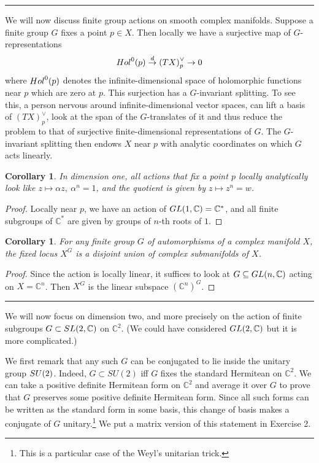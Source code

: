 \documentclass[11pt]{article}
\numberwithin{equation}{section}
\numberwithin{footnote}{section}
\newtheorem{cor}[thm]{Corollary}
\newcommand{\blue}{\color{blue}}
\newcommand{\C}{{\mathbb C}}
\begin{document}
\smallskip
{\blue \hrule}
We will now discuss finite group actions on smooth complex manifolds. 
Suppose a finite group $G$ fixes a point $p\in X$. Then locally we have a surjective map of $G$-representations 
$$
{\rm Hol}^0(p) \stackrel {d}{\to} \left(TX \right)^\vee_p\to 0
$$
where ${\rm Hol}^0(p)$ denotes the infinite-dimensional space of holomorphic functions near $p$ which are zero at $p$.
This surjection has a $G$-invariant splitting. To see this, a person nervous around infinite-dimensional vector spaces, can lift a basis of $\left(TX \right)^\vee_p$, look at the span of the $G$-translates of it and thus reduce the problem to that of surjective finite-dimensional representations of $G$. The $G$-invariant splitting then endows $X$ near $p$ with analytic coordinates on which $G$ acts {\blue linearly}. 


\smallskip
\begin{cor}\label{dim1fixed}
In dimension one, all actions that fix a point $p$ locally analytically look like $z\mapsto \alpha z,~\alpha^n=1$, and the quotient is given by 
$z\mapsto z^n=w$.
\end{cor}

\begin{proof}
Locally near $p$, we have an action of ${\rm GL}(1,\C) =\C^*$, and all finite subgroups of $ \C^*$ are given by groups of $n$-th roots of $1$.
\end{proof}

\begin{cor}
For any finite group $G$ of automorphisms of a complex manifold $X$, the fixed locus $X^G$ is a disjoint union of  complex submanifolds of $X$.
\end{cor}

\begin{proof}
Since the action is locally linear, it suffices to look at $G\subseteq {\rm GL}(n,\C)$ acting on $X=\C^n$. Then $X^G$ is the linear subspace $(\C^n)^G$.
\end{proof}

\smallskip
{\blue \hrule}

We will now focus on dimension two, and more precisely on the action of finite subgroups
$G\subset {\rm SL}(2,\C)$ on $\C^2$. (We could have considered ${\rm GL}(2,\C)$ but it is more complicated.)

\smallskip
We first remark that any such $G$ can be conjugated to lie inside the unitary group ${\rm SU}(2)$. Indeed,
$G\subset SU(2)$ iff $G$ fixes the standard Hermitean on $\C^2$. We can take a positive definite Hermitean form on $\C^2$ and average it over $G$ to prove that $G$ preserves {\blue some} positive definite Hermitean form. Since all such forms can be written as the standard form in some basis, this change of basis makes a conjugate of $G$ unitary.\footnote{ This is a particular case of the Weyl's unitarian trick.} We put a matrix version of this  statement in Exercise 2.
\end{document}
